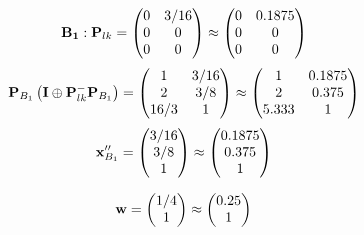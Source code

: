 \documentclass[10pt,a4paper]{article}
\begin{document}
	\[
		\bold{B_1}: \bold{P}_{lk} = 
		\begin{pmatrix}
			{{0}}{} & {{3}} / {{16}} \\
			{{0}}{} & {{0}}{} \\
			{{0}}{} & {{0}}{} \\
		\end{pmatrix}
		\approx
		\begin{pmatrix}
			0        & 0.1875   \\
			0        & 0        \\
			0        & 0        \\
		\end{pmatrix}
	\]
	\[
		\bold{P}_{B_1}\left(\bold{I} \oplus \bold{P}_{lk}^{-}\bold{P}_{B_1}\right) = 
		\begin{pmatrix}
			{1}{} & {{3}} / {{16}} \\
			{{2}}{} & {{3}} / {{8}} \\
			{{16}} / {{3}} & {1}{} \\
		\end{pmatrix}
		\approx
		\begin{pmatrix}
			1        & 0.1875   \\
			2        & 0.375    \\
			5.333    & 1        \\
		\end{pmatrix}
	\]
	\[
		\bold{x}''_{B_1} = 
		\begin{pmatrix}
			{{3}} / {{16}} \\
			{{3}} / {{8}} \\
			{1}{} \\
		\end{pmatrix}
		\approx
		\begin{pmatrix}
			0.1875   \\
			0.375    \\
			1        \\
		\end{pmatrix}
	\]

	\[
		\bold{w} = 
		\begin{pmatrix}
			{1} / {{4}} \\
			{1}{} \\
		\end{pmatrix}
		\approx
		\begin{pmatrix}
			0.25     \\
			1        \\
		\end{pmatrix}
	\]
\end{document}
